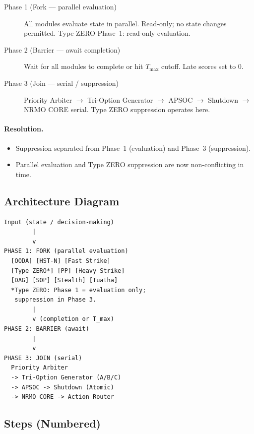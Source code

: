 \begin{description}
\item[Phase 1 (Fork --- parallel evaluation)]
All modules evaluate state in parallel. Read-only; no state
changes permitted. Type ZERO Phase~1: read-only evaluation.
\item[Phase 2 (Barrier --- await completion)]
Wait for all modules to complete or hit $T_{\max}$ cutoff. Late
scores set to 0.
\item[Phase 3 (Join --- serial / suppression)]
Priority Arbiter $\to$ Tri-Option Generator $\to$ APSOC $\to$
Shutdown $\to$ NRMO CORE serial. Type ZERO suppression operates
here.
\end{description}

\paragraph{Resolution.}
\begin{itemize}
\item Suppression separated from Phase~1 (evaluation) and Phase~3
(suppression).
\item Parallel evaluation and Type ZERO suppression are now
non-conflicting in time.
\end{itemize}

\subsection{Architecture Diagram}

\begin{lstlisting}[basicstyle=\ttfamily\scriptsize,frame=single]
Input (state / decision-making)
        |
        v
PHASE 1: FORK (parallel evaluation)
  [OODA] [HST-N] [Fast Strike]
  [Type ZERO*] [PP] [Heavy Strike]
  [DAG] [SOP] [Stealth] [Tuatha]
  *Type ZERO: Phase 1 = evaluation only;
   suppression in Phase 3.
        |
        v (completion or T_max)
PHASE 2: BARRIER (await)
        |
        v
PHASE 3: JOIN (serial)
  Priority Arbiter
  -> Tri-Option Generator (A/B/C)
  -> APSOC -> Shutdown (Atomic)
  -> NRMO CORE -> Action Router
\end{lstlisting}

\subsection{Steps (Numbered)}

